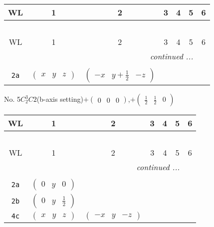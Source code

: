 \documentclass[fleqn,9pt,landscape]{jsarticle}
\begin{document}
\begin{center}
\renewcommand{\arraystretch}{1.2}
\begin{longtable}{ccccccc}
 \hline \hline
WL & 1 & 2 & 3 & 4 & 5 & 6 \\ \hline \endfirsthead

\multicolumn{6}{l}{\tablename\ \thetable{}} \\
 \hline \hline
WL & 1 & 2 & 3 & 4 & 5 & 6 \\ \hline \endhead

 \hline \hline
\multicolumn{6}{r}{\footnotesize\it continued ...} \\ \endfoot

 \hline \hline
\multicolumn{6}{r}{} \\ \endlastfoot

{\tt 2a} & $ \begin{pmatrix} x & y & z \end{pmatrix} $ & $ \begin{pmatrix} - x & y + \frac{1}{2} & - z \end{pmatrix} $ \\
\end{longtable}
\end{center}
\newpage
No. 5\quad$C_{2}^{3}$\quad$C2$\quad(b-axis setting)\quad[ monoclinic ]\quad$+\begin{pmatrix} 0 & 0 & 0 \end{pmatrix}$,\quad $+\begin{pmatrix} \frac{1}{2} & \frac{1}{2} & 0 \end{pmatrix}$
\begin{center}
\renewcommand{\arraystretch}{1.2}
\begin{longtable}{ccccccc}
 \hline \hline
WL & 1 & 2 & 3 & 4 & 5 & 6 \\ \hline \endfirsthead

\multicolumn{6}{l}{\tablename\ \thetable{}} \\
 \hline \hline
WL & 1 & 2 & 3 & 4 & 5 & 6 \\ \hline \endhead

 \hline \hline
\multicolumn{6}{r}{\footnotesize\it continued ...} \\ \endfoot

 \hline \hline
\multicolumn{6}{r}{} \\ \endlastfoot

{\tt 2a} & $ \begin{pmatrix} 0 & y & 0 \end{pmatrix} $ & $  $ \\ \hline
{\tt 2b} & $ \begin{pmatrix} 0 & y & \frac{1}{2} \end{pmatrix} $ & $  $ \\ \hline
{\tt 4c} & $ \begin{pmatrix} x & y & z \end{pmatrix} $ & $ \begin{pmatrix} - x & y & - z \end{pmatrix} $ \\
\end{longtable}
\end{center}
\end{document}
